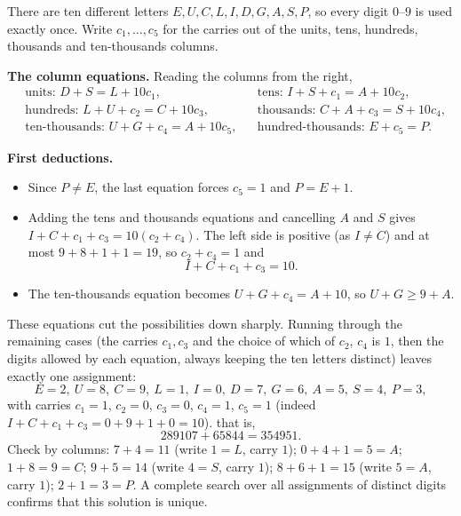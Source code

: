 There are ten different letters $E,U,C,L,I,D,G,A,S,P$, so every digit $0$--$9$ is used exactly once. Write $c_1,\dots,c_5$ for the carries out of the units, tens, hundreds, thousands and ten-thousands columns.

\textbf{The column equations.} Reading the columns from the right,
\[
\begin{aligned}
&\text{units: } D+S=L+10c_1, &&\text{tens: } I+S+c_1=A+10c_2,\\
&\text{hundreds: } L+U+c_2=C+10c_3, &&\text{thousands: } C+A+c_3=S+10c_4,\\
&\text{ten-thousands: } U+G+c_4=A+10c_5, &&\text{hundred-thousands: } E+c_5=P .
\end{aligned}
\]

\textbf{First deductions.}
\begin{itemize}
\item Since $P\ne E$, the last equation forces $c_5=1$ and $P=E+1$.
\item Adding the tens and thousands equations and cancelling $A$ and $S$ gives $I+C+c_1+c_3=10(c_2+c_4)$. The left side is positive (as $I\ne C$) and at most $9+8+1+1=19$, so $c_2+c_4=1$ and
\[
I+C+c_1+c_3=10 .
\]
\item The ten-thousands equation becomes $U+G+c_4=A+10$, so $U+G\ge 9+A$.
\end{itemize}
These equations cut the possibilities down sharply. Running through the remaining cases (the carries $c_1,c_3$ and the choice of which of $c_2$, $c_4$ is $1$, then the digits allowed by each equation, always keeping the ten letters distinct) leaves exactly one assignment:
\[
E=2,\ U=8,\ C=9,\ L=1,\ I=0,\ D=7,\ G=6,\ A=5,\ S=4,\ P=3 ,
\]
with carries $c_1=1$, $c_2=0$, $c_3=0$, $c_4=1$, $c_5=1$ (indeed $I+C+c_1+c_3=0+9+1+0=10$). that is,
\[
\boxed{289107+65844=354951}.
\]
Check by columns: $7+4=11$ (write $1=L$, carry $1$); $0+4+1=5=A$; $1+8=9=C$; $9+5=14$ (write $4=S$, carry $1$); $8+6+1=15$ (write $5=A$, carry $1$); $2+1=3=P$. A complete search over all assignments of distinct digits confirms that this solution is unique.
